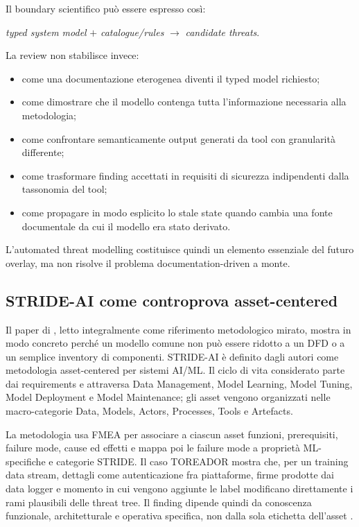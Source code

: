 \documentclass[12pt,a4paper,oneside]{report}
\begin{document}
Il boundary scientifico può essere espresso così:

\begin{center}
\textit{typed system model} $+$ \textit{catalogue/rules} $\rightarrow$ \textit{candidate threats}.
\end{center}

La review non stabilisce invece:

\begin{itemize}
\item come una documentazione eterogenea diventi il typed model richiesto;
\item come dimostrare che il modello contenga tutta l'informazione necessaria alla metodologia;
\item come confrontare semanticamente output generati da tool con granularità differente;
\item come trasformare finding accettati in requisiti di sicurezza indipendenti dalla tassonomia del tool;
\item come propagare in modo esplicito lo stale state quando cambia una fonte documentale da cui il modello era stato derivato.
\end{itemize}

L'automated threat modelling costituisce quindi un elemento essenziale del futuro overlay, ma non risolve il problema documentation-driven a monte.

\subsection{STRIDE-AI come controprova asset-centered}

Il paper di \citet{mauri2022strideai}, letto integralmente come riferimento metodologico mirato, mostra in modo concreto perché un modello comune non può essere ridotto a un DFD o a un semplice inventory di componenti. STRIDE-AI è definito dagli autori come metodologia asset-centered per sistemi AI/ML. Il ciclo di vita considerato parte dai requirements e attraversa Data Management, Model Learning, Model Tuning, Model Deployment e Model Maintenance; gli asset vengono organizzati nelle macro-categorie Data, Models, Actors, Processes, Tools e Artefacts.

La metodologia usa FMEA per associare a ciascun asset funzioni, prerequisiti, failure mode, cause ed effetti e mappa poi le failure mode a proprietà ML-specifiche e categorie STRIDE. Il caso TOREADOR mostra che, per un training data stream, dettagli come autenticazione fra piattaforme, firme prodotte dai data logger e momento in cui vengono aggiunte le label modificano direttamente i rami plausibili delle threat tree. Il finding dipende quindi da conoscenza funzionale, architetturale e operativa specifica, non dalla sola etichetta dell'asset \citep{mauri2022strideai}.
\end{document}
